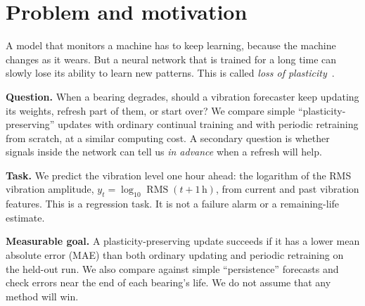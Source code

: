 \documentclass[11pt,twocolumn]{article}
\newcommand{\rms}{\operatorname{RMS}}
\begin{document}

\section{Problem and motivation}
A model that monitors a machine has to keep learning, because the machine changes as it wears. But a neural network that is trained for a long time can slowly lose its ability to learn new patterns. This is called \emph{loss of plasticity}~\citep{dohare2024}.

\textbf{Question.} When a bearing degrades, should a vibration forecaster keep updating its weights, refresh part of them, or start over? We compare simple ``plasticity-preserving'' updates with ordinary continual training and with periodic retraining from scratch, at a similar computing cost. A secondary question is whether signals inside the network can tell us \emph{in advance} when a refresh will help.

\textbf{Task.} We predict the vibration level one hour ahead: the logarithm of the RMS vibration amplitude, $y_t=\log_{10}\rms(t+1\,\mathrm{h})$, from current and past vibration features. This is a regression task. It is not a failure alarm or a remaining-life estimate.

\textbf{Measurable goal.} A plasticity-preserving update succeeds if it has a lower mean absolute error (MAE) than both ordinary updating and periodic retraining on the held-out run. We also compare against simple ``persistence'' forecasts and check errors near the end of each bearing's life. We do not assume that any method will win.
\end{document}

